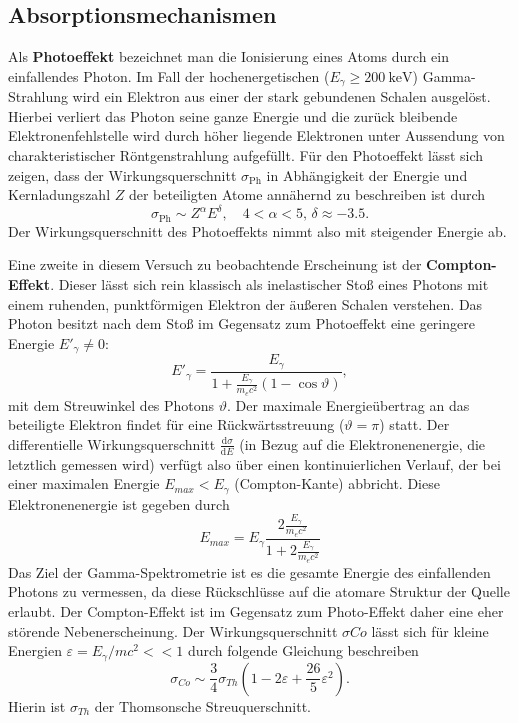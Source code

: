 \subsection{Absorptionsmechanismen}
Als \textbf{Photoeffekt} bezeichnet man die Ionisierung eines Atoms durch ein einfallendes Photon. Im Fall der
hochenergetischen ($E_\gamma \geq  \SI{200}{\kilo\electronvolt}$) Gamma-Strahlung wird ein Elektron aus einer der stark gebundenen Schalen
ausgelöst. Hierbei verliert das Photon seine ganze Energie und die zurück bleibende Elektronenfehlstelle wird durch
höher liegende Elektronen unter Aussendung von charakteristischer Röntgenstrahlung aufgefüllt. 
Für den Photoeffekt lässt sich zeigen, dass der Wirkungsquerschnitt $\sigma_{\text{Ph}}$ in Abhängigkeit der Energie und
Kernladungszahl $Z$ der beteiligten Atome annähernd zu beschreiben ist durch
\begin{equation}
    \sigma_{\text{Ph}} \sim Z^{\alpha} E^{\delta}, \quad 4 < \alpha < 5, \, \delta \approx -\num{3.5}.
    \label{eq:wirkungsquerschnitt_photo}
\end{equation}
Der Wirkungsquerschnitt des Photoeffekts nimmt also mit steigender Energie ab.

Eine zweite in diesem Versuch zu beobachtende Erscheinung ist der \textbf{Compton-Effekt}. Dieser lässt sich rein
klassisch als inelastischer Stoß eines Photons mit einem ruhenden, punktförmigen Elektron der äußeren Schalen verstehen.
Das Photon besitzt nach dem Stoß im Gegensatz zum Photoeffekt eine geringere Energie $E'_\gamma \neq 0$:
\begin{equation}
    {E'}_{\!\gamma} = \frac{E_\gamma}{1 + \frac{E_\gamma}{m_e c^2} \left(1 - \cos\vartheta \right)},
    \label{eq:rückstreu}
\end{equation}
mit dem Streuwinkel des Photons $\vartheta$. Der maximale Energieübertrag an das beteiligte Elektron findet für eine
Rückwärtsstreuung ($\vartheta = \pi$) statt. Der differentielle Wirkungsquerschnitt $\frac{\mathup{d}\sigma}{\mathup{d}E}$
(in Bezug auf die Elektronenenergie, die letztlich gemessen wird) verfügt also über einen kontinuierlichen Verlauf, der
bei einer maximalen Energie $E_{max} < E_\gamma$ (Compton-Kante) abbricht. Diese Elektronenenergie ist gegeben durch
\begin{equation}
    E_{max} = E_\gamma \frac{2\frac{E_\gamma}{m_ec^2}}{1 + 2\frac{E_\gamma}{m_ec^2}}
    \label{eq: comptonkante_energie}
\end{equation}
Das Ziel der Gamma-Spektrometrie ist es die
gesamte Energie des einfallenden Photons zu vermessen, da diese Rückschlüsse auf die atomare Struktur der Quelle
erlaubt. Der Compton-Effekt ist im Gegensatz zum Photo-Effekt daher eine eher störende Nebenerscheinung.
Der Wirkungsquerschnitt $\sigma{Co}$ lässt sich für kleine Energien $\varepsilon = E_\gamma / m c^2 << 1$
durch folgende Gleichung beschreiben
\begin{equation}
    \sigma_{Co} \sim \frac{3}{4}\sigma_{Th} \left(1 - 2\varepsilon + \frac{26}{5}\varepsilon^2 \right).
\end{equation}
Hierin ist $\sigma_{Th}$ der Thomsonsche Streuquerschnitt.

